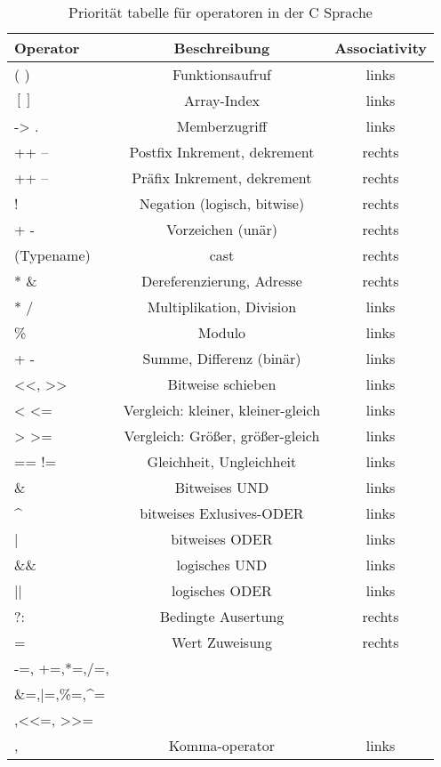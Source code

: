 \documentclass{article}[12pt]
\begin{document}
\begin{table}
\caption{Priorität tabelle für operatoren in der C Sprache\label{priortab}}
\centering
\begin{tabular}{| l c c|}
\hline
Operator & Beschreibung    & Associativity  \\
\hline
( )      & Funktionsaufruf & links  \\
$[ ]$     & Array-Index     & links  \\
-> .     & Memberzugriff   & links \\
++ -- 	 & Postfix Inkrement, dekrement &rechts \\
\hline
++ --    & Präfix  Inkrement, dekrement &rechts \\
! ~      & Negation (logisch, bitwise)  &rechts \\
+ -      & Vorzeichen (unär)            &rechts \\
(Typename) & cast                       &rechts \\
* \&       & Dereferenzierung, Adresse  &rechts \\
\hline
* /        & Multiplikation, Division     &links \\
\%         & Modulo                       &links \\
\hline
+ -        & Summe, Differenz (binär)     &links \\  
\hline
<<, >>     & Bitweise schieben            &links\\
\hline
< <=       & Vergleich: kleiner, kleiner-gleich      &links\\
> >=       & Vergleich: Größer, größer-gleich        &links\\
\hline
== !=      &Gleichheit, Ungleichheit                 &links\\
\hline
\&         & Bitweises UND & links \\
\hline
\^{}         & bitweises Exlusives-ODER &links\\
\hline
|          & bitweises ODER           &links\\
\hline
\&\&       & logisches UND            &links\\
\hline
||         & logisches ODER           &links\\
\hline
?:         & Bedingte Ausertung       &rechts\\
\hline
=          & Wert Zuweisung           &rechts\\
\hline
-=, +=,*=,/=,   &                     &      \\
\&=,|=,\%=,\^{}=&                     &      \\
,<<=, >>=& \raisebox{1.5ex}{Kombinierte Zuweisungsoperator} & \raisebox{1.5ex}{rechts}\\
\hline
,                                   & Komma-operator                 & links \\
\hline
\end{tabular}
\end{table}
\end{document}

